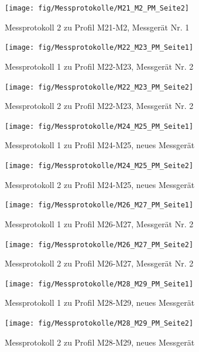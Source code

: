 \begin{figure}[!ht]
 \centering
 \texttt{[image: fig/Messprotokolle/M21\_M2\_PM\_Seite2]}
 \caption{Messprotokoll 2 zu Profil M21-M2, Messgerät Nr. 1}
\end{figure}

\begin{figure}[!ht]
 \centering
 \texttt{[image: fig/Messprotokolle/M22\_M23\_PM\_Seite1]}
 \caption{Messprotokoll 1 zu Profil M22-M23, Messgerät Nr. 2}
\end{figure}

\begin{figure}[!ht]
 \centering
 \texttt{[image: fig/Messprotokolle/M22\_M23\_PM\_Seite2]}
 \caption{Messprotokoll 2 zu Profil M22-M23, Messgerät Nr. 2}
\end{figure}

\begin{figure}[!ht]
 \centering
 \texttt{[image: fig/Messprotokolle/M24\_M25\_PM\_Seite1]}
 \caption{Messprotokoll 1 zu Profil M24-M25, neues Messgerät}
\end{figure}

\begin{figure}[!ht]
 \centering
 \texttt{[image: fig/Messprotokolle/M24\_M25\_PM\_Seite2]}
 \caption{Messprotokoll 2 zu Profil M24-M25, neues Messgerät}
\end{figure}

\begin{figure}[!ht]
 \centering
 \texttt{[image: fig/Messprotokolle/M26\_M27\_PM\_Seite1]}
 \caption{Messprotokoll 1 zu Profil M26-M27, Messgerät Nr. 2}
\end{figure}

\begin{figure}[!ht]
 \centering
 \texttt{[image: fig/Messprotokolle/M26\_M27\_PM\_Seite2]}
 \caption{Messprotokoll 2 zu Profil M26-M27, Messgerät Nr. 2}
\end{figure}

\begin{figure}[!ht]
 \centering
 \texttt{[image: fig/Messprotokolle/M28\_M29\_PM\_Seite1]}
 \caption{Messprotokoll 1 zu Profil M28-M29, neues Messgerät}
\end{figure}

\begin{figure}[!ht]
 \centering
 \texttt{[image: fig/Messprotokolle/M28\_M29\_PM\_Seite2]}
 \caption{Messprotokoll 2 zu Profil M28-M29, neues Messgerät}
\end{figure}

